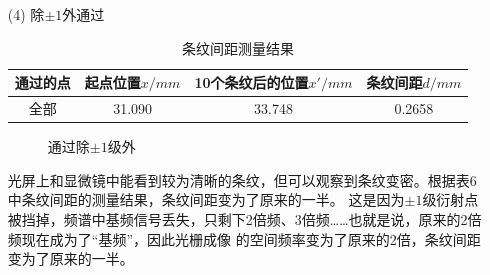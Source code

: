 \documentclass{article}
\begin{document}
\begin{enumerate}
        
        \item [(4)] 除$\pm 1$外通过 \\
        \begin{table}[htb]
            \centering
            \begin{tabular}{|c|c|c|c|}
                \hline
                通过的点 & 起点位置$x/mm$ & 10个条纹后的位置$x'/mm$ & 条纹间距$d/mm$ \\
                \hline
                全部 & 31.090 & 33.748 & 0.2658 \\
                \hline
            \end{tabular}
            \caption{条纹间距测量结果}
        \end{table}
        \newpage
        \begin{figure}[htb]
            \centering
            \caption{通过除$\pm 1$级外}
        \end{figure}

        光屏上和显微镜中能看到较为清晰的条纹，但可以观察到条纹变密。根据表6中条纹间距的测量结果，条纹间距变为了原来的一半。
        这是因为$\pm 1$级衍射点被挡掉，频谱中基频信号丢失，只剩下2倍频、3倍频……也就是说，原来的2倍频现在成为了“基频”，因此光栅成像
        的空间频率变为了原来的2倍，条纹间距变为了原来的一半。
        

\end{enumerate}
\end{document}
